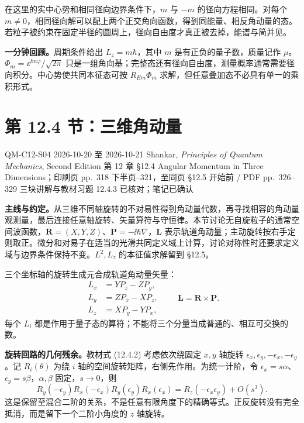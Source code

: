 在这里的实中心势和相同径向边界条件下，$m$ 与 $-m$ 的径向方程相同。对每个 $m\neq0$，相同径向解可以配上两个正交角向函数，得到同能量、相反角动量的态。若粒子被约束在固定半径的圆周上，径向自由度才真正被去掉，能谱与简并见。

\textbf{一分钟回顾。}周期条件给出 $L_z=m\hbar$，其中 $m$ 是有正负的量子数，质量记作 $\mu$。$\Phi_m=\ee^{\ii m\varphi}/\sqrt{2\pi}$ 只是一组角向基；完整态还有径向自由度，测量概率通常需要径向积分。中心势使共同本征态可按 $R_{Em}\Phi_m$ 求解，但任意叠加态不必具有单一的乘积形式。

\section{第 12.4 节：三维角动量}
\label{section:QM-C12-S04}
\studymeta
  {QM-C12-S04}
  {2026-10-20 至 2026-10-21}
  {Shankar, \textit{Principles of Quantum Mechanics}, Second Edition}
  {第 12 章 \S 12.4 Angular Momentum in Three Dimensions；印刷页 pp.~318 下半页--321，至同页 \S 12.5 开始前 / PDF pp.~326--329}
  {三块讲解与教材习题 12.4.3 已核对；笔记已确认}

\textbf{主线与约定。}从三维不同轴旋转的不对易性得到角动量代数，再寻找相容的角动量观测量，最后连接任意轴旋转、矢量算符与守恒律。本节讨论无自旋粒子的通常空间波函数，$\mathbf R=(X,Y,Z)$、$\mathbf P=-\ii\hbar\nabla$，$\mathbf L$ 表示轨道角动量；主动旋转按右手定则取正。微分和对易子在适当的光滑共同定义域上计算，讨论对称性时还要求定义域与边界条件保持不变。$L^2,L_z$ 的本征值求解留到 \S 12.5。


三个坐标轴的旋转生成元合成轨道角动量矢量：
\begin{equation}
  \boxed{\begin{aligned}
    L_x&=YP_z-ZP_y,\\
    L_y&=ZP_x-XP_z,\\
    L_z&=XP_y-YP_x,
  \end{aligned}\qquad \mathbf L=\mathbf R\times\mathbf P.}
  \label{eq:QM-C12-S04-orbital-components}
\end{equation}
每个 $L_i$ 都是作用于量子态的算符；不能将三个分量当成普通的、相互可交换的数。

\textbf{旋转回路的几何残余。}教材式 (12.4.2) 考虑依次绕固定 $x,y$ 轴旋转 $\epsilon_x,\epsilon_y,-\epsilon_x,-\epsilon_y$。记 $R_i(\theta)$ 为绕 $i$ 轴的空间旋转矩阵，右侧先作用。为统一计阶，令 $\epsilon_x=s\alpha$、$\epsilon_y=s\beta$，$\alpha,\beta$ 固定，$s\to0$，则
\begin{equation}
  R_y(-\epsilon_y)R_x(-\epsilon_x)R_y(\epsilon_y)R_x(\epsilon_x)
  =R_z(-\epsilon_x\epsilon_y)+O(s^3).
  \label{eq:QM-C12-S04-geometric-loop}
\end{equation}
这是保留至混合二阶的关系，不是任意有限角度下的精确等式。正反旋转没有完全抵消，而是留下一个二阶小角度的 $z$ 轴旋转。

